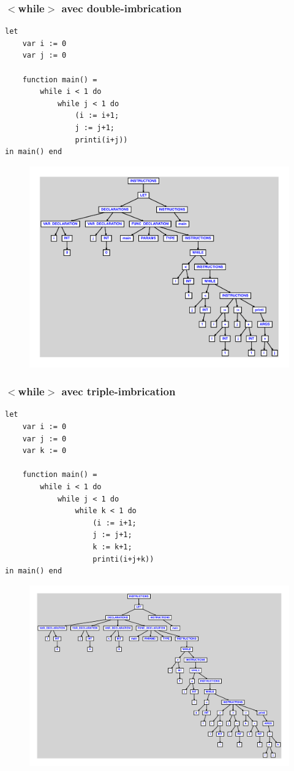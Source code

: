 \documentclass{article}
\begin{document}
\subsubsection{$ < $while$ > $ avec double-imbrication}
\begin{lstlisting}
let
	var i := 0
	var j := 0

	function main() =
		while i < 1 do
			while j < 1 do
				(i := i+1;
				j := j+1;
				printi(i+j))
in main() end
\end{lstlisting}
\newpage
\begin{figure}[H]
\centering
\includegraphics[max width=\textwidth]{ast/ast_336.pdf}
\end{figure}
\newpage
\subsubsection{$ < $while$ > $ avec triple-imbrication}
\begin{lstlisting}
let
	var i := 0
	var j := 0
	var k := 0

	function main() =
		while i < 1 do
			while j < 1 do
				while k < 1 do
					(i := i+1;
					j := j+1;
					k := k+1;
					printi(i+j+k))
in main() end
\end{lstlisting}
\newpage
\begin{figure}[H]
\centering
\includegraphics[max width=\textwidth]{ast/ast_337.pdf}
\end{figure}
\newpage
\end{document}
